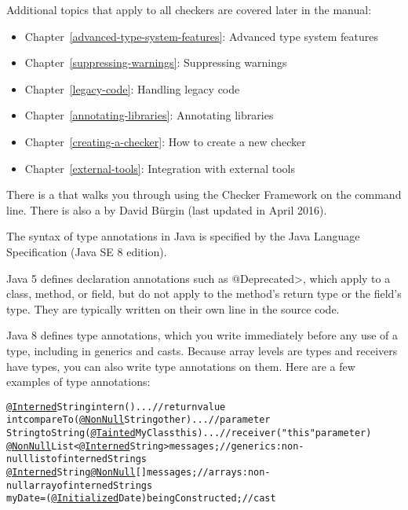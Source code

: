 Additional topics that apply to all checkers are covered later in the manual:
\begin{itemize}
\item Chapter~\ref{advanced-type-system-features}: Advanced type system features
\item Chapter~\ref{suppressing-warnings}: Suppressing warnings
\item Chapter~\ref{legacy-code}: Handling legacy code
\item Chapter~\ref{annotating-libraries}: Annotating libraries
\item Chapter~\ref{creating-a-checker}: How to create a new checker
\item Chapter~\ref{external-tools}: Integration with external tools
\end{itemize}


There is a
that walks you through using the Checker Framework on the
command line.  There is also a
 by David B\"urgin (last updated in April 2016).




The syntax of type annotations in Java is specified by
the Java Language Specification (Java SE 8 edition).

Java 5 defines declaration annotations such as \<@Deprecated>, which apply
to a class, method, or field, but do not apply to the method's return type
or the field's type.  They are typically written on their own line in the
source code.

Java 8 defines type annotations, which you write immediately before any
use of a type, including in generics and casts.  Because array levels are
types and receivers have types, you can also write type annotations on
them.  Here are a few examples of type annotations:

\begin{smaller}
\begin{alltt}
  \underline{@Interned} String intern() \ttlcb{} ... \ttrcb{}               // return value
  int compareTo(\underline{@NonNull} String other) \ttlcb{} ... \ttrcb{}    // parameter
  String toString(\underline{@Tainted} MyClass this) \ttlcb{} ... \ttrcb{}  // receiver ("this" parameter)
  \underline{@NonNull} List<\underline{@Interned} String> messages;       // generics:  non-null list of interned Strings
  \underline{@Interned} String \underline{@NonNull} [] messages;          // arrays:  non-null array of interned Strings
  myDate = (\underline{@Initialized} Date) beingConstructed;  // cast
\end{alltt}
\end{smaller}

